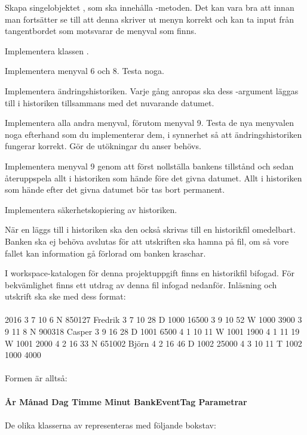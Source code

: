 \Task Skapa singelobjektet , som ska innehålla -metoden. Det kan vara bra att innan man fortsätter se till att denna skriver ut menyn korrekt och kan ta input från tangentbordet som motsvarar de menyval som finns.

\Task Implementera klassen .

\Subtask Implementera menyval 6 och 8. Testa noga.

\Subtask Implementera ändringshistoriken. Varje gång  anropas ska dess -argument läggas till i historiken tillsammans med det nuvarande datumet.

\Subtask Implementera alla andra menyval, förutom menyval 9. Testa de nya menyvalen noga efterhand som du implementerar dem, i synnerhet så att ändringshistoriken fungerar korrekt. Gör de utökningar du anser behövs.

\Task Implementera menyval 9 genom att först nollställa bankens tillstånd och sedan återuppspela allt i historiken som hände före det givna datumet. Allt i historiken som hände efter det givna datumet bör tas bort permanent.

\Task Implementera säkerhetskopiering av historiken.

\Subtask När en  läggs till i historiken ska den också skrivas till en historikfil omedelbart. Banken ska ej behöva avslutas för att utskriften ska hamna på fil, om så vore fallet kan information gå förlorad om banken kraschar.

I workspace-katalogen för denna projektuppgift finns en historikfil bifogad. För bekvämlighet finns ett utdrag av denna fil infogad nedanför. Inläsning och utskrift ska ske med dess format:\\~\\
2016 3 7 10 6 N 850127 Fredrik 3 7 10 28 D 1000 16500 3 9 10 52 W 1000 3900 3 9 11 8 N 900318 Casper 3 9 16 28 D 1001 6500 4 1 10 11 W 1001 1900 4 1 11 19 W 1001 2000 4 2 16 33 N 651002 Björn 4 2 16 46 D 1002 25000 4 3 10 11 T 1002 1000 4000\\~\\
Formen är alltså:\\~\\
\textbf{År  Månad  Dag  Timme  Minut  BankEventTag  Parametrar}
\\~\\
De olika klasserna av  representeras med följande bokstav:

